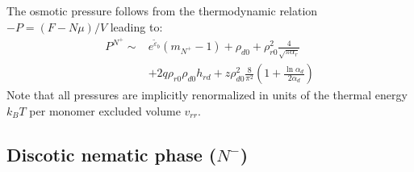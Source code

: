 The osmotic pressure follows from  the thermodynamic relation $-P = (F - N \mu)/V$ leading to:
\begin{align}
P^{N^{+}} \sim & e^{\tilde{\varepsilon}_{b}} (m_{N^{+}} -1) 
+ \rho_{d0}  +  \rho_{r0}^{2}  \frac{4}{\sqrt{\pi \alpha_{r}}}
 \nonumber \\ 
& +   2 q \rho_{r0}  \rho_{d0} h_{rd}
 + z \rho_{d0}^{2} 
  \frac{8}{\pi^{2}} \left ( 1+ \frac{\ln \alpha_{d}}{2 \alpha_{d}}   \right )
\label{pressurenp}
\end{align}
Note that all pressures are implicitly renormalized in units of the thermal energy $k_{B}T$ per monomer excluded volume  $v_{rr}$.


\subsection{Discotic nematic phase ($N^{-}$)}

